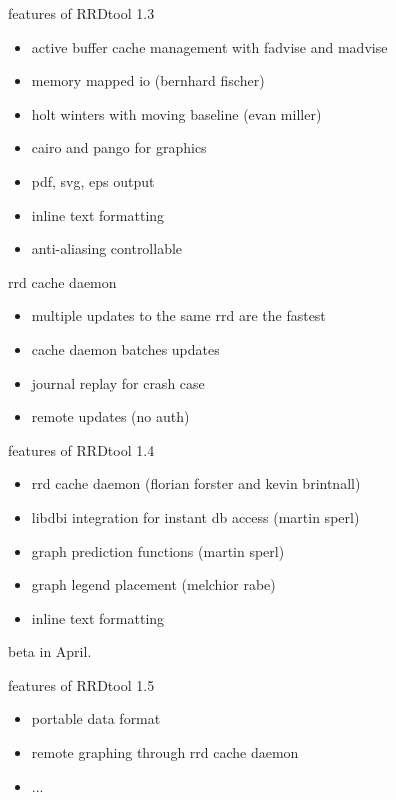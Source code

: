 \begin{frame}{features of RRDtool 1.3}
\begin{itemize}
\item active buffer cache management with fadvise and madvise
\item memory mapped io (bernhard fischer)
\item holt winters with moving baseline (evan miller)
\item cairo and pango for graphics
\item pdf, svg, eps output
\item inline text formatting
\item anti-aliasing controllable
\end{itemize}
\end{frame}

\newpage

\begin{frame}{rrd cache daemon}
\begin{itemize}
\item multiple updates to the same rrd are the fastest
\item cache daemon batches updates
\item journal replay for crash case
\item remote updates (no auth)
\end{itemize}
\end{frame}

\begin{frame}{features of RRDtool 1.4}
\begin{itemize}
\item rrd cache daemon (florian forster and kevin brintnall)
\item libdbi integration for instant db access (martin sperl)
\item graph prediction functions (martin sperl)
\item graph legend placement (melchior rabe)
\item inline text formatting
\end{itemize}
beta in April.
\end{frame}

\begin{frame}{features of RRDtool 1.5}
\begin{itemize}
\item portable data format
\item remote graphing through rrd cache daemon
\item ...
\end{itemize}
\end{frame}


